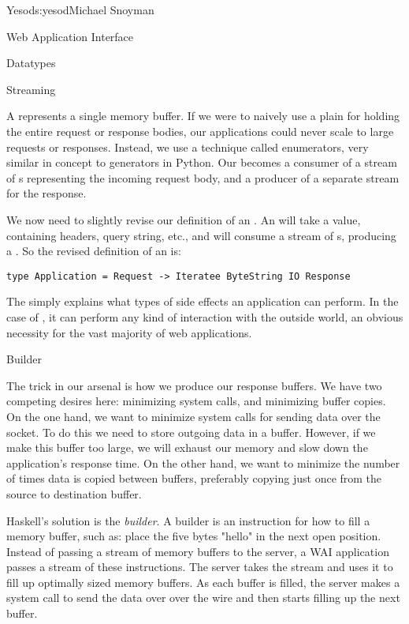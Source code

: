 \begin{aosachapter}{Yesod}{s:yesod}{Michael Snoyman}
\begin{aosasect1}{Web Application Interface}
\begin{aosasect2}{Datatypes}
\end{aosasect2}

\begin{aosasect2}{Streaming}

A  represents a single memory buffer. If we were to naively
use a plain  for holding the entire request or response
bodies, our applications could never scale to large requests or
responses. Instead, we use a technique called enumerators, very
similar in concept to generators in Python. Our  becomes a
consumer of a stream of s representing the incoming request
body, and a producer of a separate stream for the response.

We now need to slightly revise our definition of an . An
 will take a  value, containing headers, query
string, etc., and will consume a stream of s, producing a
. So the revised definition of an  is:

\begin{verbatim}
type Application = Request -> Iteratee ByteString IO Response
\end{verbatim}

\noindent The  simply explains what types of side effects an application can
perform. In the case of , it can perform any kind of interaction
with the outside world, an obvious necessity for the vast majority of
web applications.

\end{aosasect2}

\begin{aosasect2}{Builder}

The trick in our arsenal is how we produce our response buffers. We
have two competing desires here: minimizing system calls, and
minimizing buffer copies. On the one hand, we want to minimize system
calls for sending data over the socket. To do this we need to store
outgoing data in a buffer. However, if we make this buffer too large,
we will exhaust our memory and slow down the application's response
time. On the other hand, we want to minimize the number of times data
is copied between buffers, preferably copying just once from the
source to destination buffer.

Haskell's solution is the \emph{builder}. A builder is an instruction for how
to fill a memory buffer, such as: place the five bytes "hello" in the
next open position. Instead of passing a stream of memory buffers to
the server, a WAI application passes a stream of these
instructions. The server takes the stream and uses it to fill up
optimally sized memory buffers. As each buffer is filled, the server
makes a system call to send the data over over the wire and then
starts filling up the next buffer.


\end{aosasect2}
\end{aosasect1}
\end{aosachapter}

